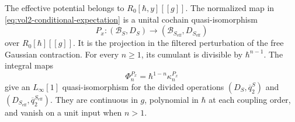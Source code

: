\begin{theorem}
\label{thm:vol2-integral-conditional}
The effective potential belongs to $R_0[\hbar,y][[g]]$.
The normalized map in \eqref{eq:vol2-conditional-expectation}
is a unital cochain quasi-isomorphism
\[
 P_x:(\mathcal B_S,D_S)\longrightarrow
                       (\mathcal B_{S_{\mathrm{eff}}},D_{S_{\mathrm{eff}}})
\]
over $R_0[\hbar][[g]]$. It is the projection in the
filtered perturbation of the free Gaussian contraction.
For every $n\geq1$, its cumulant is divisible by
$\hbar^{n-1}$. The integral maps
\begin{equation}\label{eq:vol2-divided-cumulants}
 \Phi_n^{P_x}=\hbar^{1-n}\kappa_n^{P_x}
\end{equation}
give an $L_\infty[1]$ quasi-isomorphism for the divided
operations $(D_S,\overline q_2^S)$ and
$(D_{S_{\mathrm{eff}}},\overline q_2^{S_{\mathrm{eff}}})$.
They are continuous in $g$, polynomial in $\hbar$ at each
coupling order, and vanish on a unit input when $n>1$.
\end{theorem}
